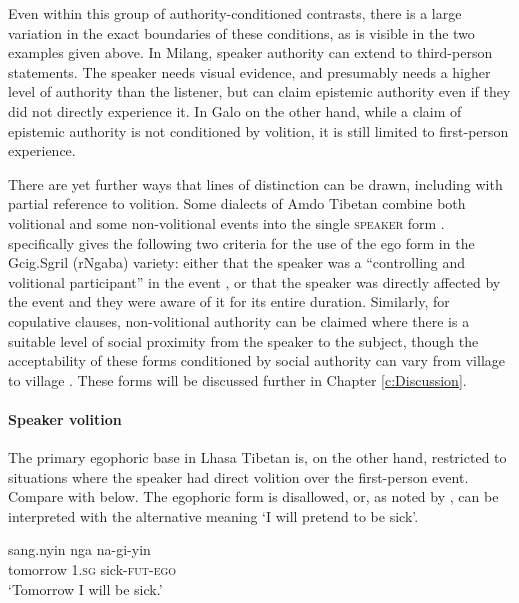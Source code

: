 Even within this group of authority-conditioned contrasts, there is a large variation in the exact boundaries of these conditions, as is visible in the two examples given above. In Milang, speaker authority can extend to third-person statements. The speaker needs visual evidence, and presumably needs a higher level of authority than the listener, but can claim epistemic authority even if they did not directly experience it. In Galo on the other hand, while a claim of epistemic authority is not conditioned by volition, it is still limited to first-person experience.

There are yet further ways that lines of distinction can be drawn, including with partial reference to volition. Some dialects of Amdo Tibetan combine both volitional and some non-volitional events into the single \textsc{speaker} form \cite{Tribur2019}.  specifically gives the following two criteria for the use of the ego form in the Gcig.Sgril (rNgaba) variety: either that the speaker was a ``controlling and volitional participant'' in the event \cite[383]{Tribur2019}, or that the speaker was directly affected by the event and they were aware of it for its entire duration. Similarly, for copulative clauses, non-volitional authority can be claimed where there is a suitable level of social proximity from the speaker to the subject, though the acceptability of these forms conditioned by social authority can vary from village to village \cite[213]{Tribur2019}. These forms will be discussed further in Chapter \ref{c:Discussion}.

\paragraph{Speaker volition}
The primary egophoric base in Lhasa Tibetan is, on the other hand, restricted to situations where the speaker had direct volition over the first-person event. Compare  with  below. The egophoric form is disallowed, or, as noted by , can be interpreted with the alternative meaning `I will pretend to be sick'.

\begin{exe}
        \ex \label{e:Description:LhasaVolition}
        \gll * sang.nyin nga na-gi-yin \\
        {} tomorrow \textsc{1.sg} sick-\textsc{fut}-\textsc{ego} \\
        \glt `Tomorrow I will be sick.' \cite[Lhasa Tibetan,][164]{Garrett2001}
\end{exe}


